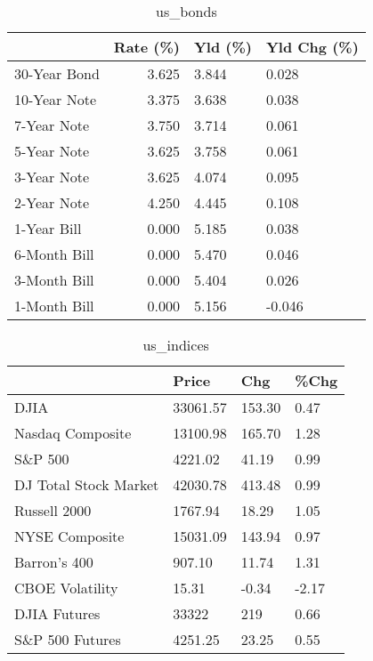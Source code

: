 \documentclass{article}%
\begin{document}
\begin{table}[htbp]%
\caption{us\_bonds}%
\centering%
\begin{adjustbox}{width=1\textwidth}%
\begin{tabular}{lrll}
\toprule
             &  Rate (\%) & Yld (\%) & Yld Chg (\%) \\
\midrule
30-Year Bond &     3.625 &   3.844 &       0.028 \\
10-Year Note &     3.375 &   3.638 &       0.038 \\
 7-Year Note &     3.750 &   3.714 &       0.061 \\
 5-Year Note &     3.625 &   3.758 &       0.061 \\
 3-Year Note &     3.625 &   4.074 &       0.095 \\
 2-Year Note &     4.250 &   4.445 &       0.108 \\
 1-Year Bill &     0.000 &   5.185 &       0.038 \\
6-Month Bill &     0.000 &   5.470 &       0.046 \\
3-Month Bill &     0.000 &   5.404 &       0.026 \\
1-Month Bill &     0.000 &   5.156 &      -0.046 \\
\bottomrule
\end{tabular}
%
\end{adjustbox}%
\end{table}

%


\begin{table}[htbp]%
\caption{us\_indices}%
\centering%
\begin{adjustbox}{width=1\textwidth}%
\begin{tabular}{llll}
\toprule
                      &    Price &    Chg &  \%Chg \\
\midrule
                 DJIA & 33061.57 & 153.30 &  0.47 \\
     Nasdaq Composite & 13100.98 & 165.70 &  1.28 \\
              S\&P 500 &  4221.02 &  41.19 &  0.99 \\
DJ Total Stock Market & 42030.78 & 413.48 &  0.99 \\
         Russell 2000 &  1767.94 &  18.29 &  1.05 \\
       NYSE Composite & 15031.09 & 143.94 &  0.97 \\
         Barron's 400 &   907.10 &  11.74 &  1.31 \\
      CBOE Volatility &    15.31 &  -0.34 & -2.17 \\
         DJIA Futures &    33322 &    219 &  0.66 \\
      S\&P 500 Futures &  4251.25 &  23.25 &  0.55 \\
\bottomrule
\end{tabular}
%
\end{adjustbox}%
\end{table}
\end{document}
